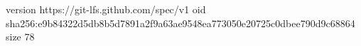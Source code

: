 version https://git-lfs.github.com/spec/v1
oid sha256:e9b84322d5db8b5d7891a2f9a63ae9548ea773050e20725c0dbee790d9c68864
size 78

